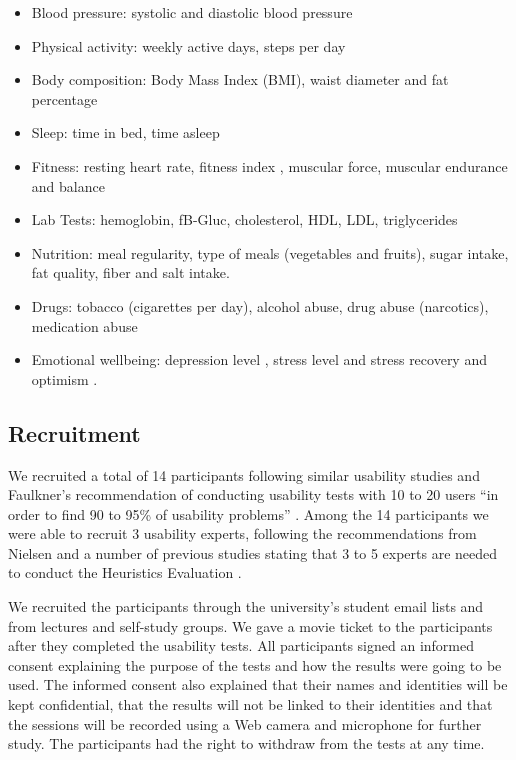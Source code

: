 \documentclass[twocolumn]{bmcart}%
\begin{document}
\begin{itemize}
	\item Blood pressure: systolic and diastolic blood pressure 
    \item Physical activity: weekly active days\cite{us2008physical, physical2008physical}, steps per day \cite{tudor2004many} 
    \item Body composition: Body Mass Index (BMI), waist diameter and fat percentage
    \item Sleep: time in bed, time asleep  
    \item Fitness: resting heart rate, fitness index \cite{oja2013tester,laukkanen1992validity}, muscular force, muscular endurance and balance \cite{suni2009fitness}
    \item Lab Tests: hemoglobin, fB-Gluc, cholesterol, HDL, LDL, triglycerides 
    \item Nutrition: meal regularity, type of meals (vegetables and fruits), sugar intake, fat quality, fiber and salt intake.
    \item Drugs: tobacco (cigarettes per day), alcohol abuse, drug abuse (narcotics), medication abuse
    \item Emotional wellbeing: depression level \cite{poutanen2010validity}, stress level and stress recovery \cite{firstbeat2014, teisala2014associations} and optimism \cite{scheier1994distinguishing}.
\end{itemize}	

\subsection*{Recruitment}

We recruited a total of 14 participants following similar usability studies and Faulkner's \cite{faulkner2003beyond} recommendation of conducting usability tests with 10 to 20 users ``in order to find 90 to 95\% of usability problems'' \cite{berry2015usability}. Among the 14 participants we were able to recruit 3 usability experts, following the recommendations from Nielsen and a number of previous studies stating that 3 to 5 experts are needed to conduct the Heuristics Evaluation \cite{johnson2011ehr, zhang2003using, nielsen1994usability, shneiderman1992designing, molich1990improving, Tognazzini2014principles}.

We recruited the participants through the university's student email lists and from lectures and self-study groups. We gave a movie ticket to the participants after they completed the usability tests. All participants signed an informed consent explaining the purpose of the tests and how the results were going to be used. The informed consent also explained that their names and identities will be kept confidential, that the results will not be linked to their identities and that the sessions will be recorded using a Web camera and microphone for further study. The participants had the right to withdraw from the tests at any time.
\end{document}
